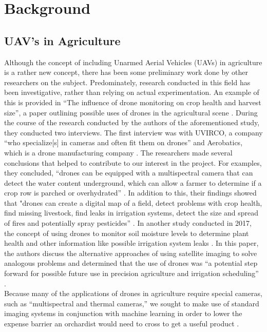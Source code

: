 \section{Background}
\subsection{UAV's in Agriculture}
Although the concept of including Unarmed Aerial Vehicles (UAVs) in agriculture is a rather new concept, there has been some preliminary work done by other researchers on the subject.
Predominately, research conducted in this field has been investigative, rather than relying on actual experimentation.
An example of this is provided in ``The influence of drone monitoring on crop health and harvest size'', a paper outlining possible uses of drones in the agricultural scene \cite{Reinecke2017}.
During the course of the research conducted by the authors of the aforementioned study, they conducted two interviews. 
The first interview was with UVIRCO, a company ``who specialize[s] in cameras and often fit them on drones'' and Aerobatics, which is a drone manufacturing company \cite{Reinecke2017}.
The researchers made several conclusions that helped to contribute to our interest in the project.
For examples, they concluded, ``drones can be equipped with a multispectral camera that can detect the water content underground, which can allow a farmer to determine if a crop row is parched or overhydrated'' \cite{Reinecke2017}.
In addition to this, their findings showed that "drones can create a digital map of a field, detect problems with crop health, find missing livestock, find leaks in irrigation systems, detect the size and spread of fires and potentially spray pesticides'' \cite{Reinecke2017}.
In another study conducted in 2017, the concept of using drones to monitor soil moisture levels to determine plant health and other information like possible irrigation system leaks \cite{Hassan2017}. In this paper, the authors discuss the alternative approaches of using satellite imaging to solve analogous problems and determined that the use of drones was ``a potential step forward for possible future use in precision agriculture and irrigation scheduling'' \cite{Hassan2017}.
\\
Because many of the applications of drones in agriculture require special cameras, such as ``multispectral and thermal cameras,'' we sought to make use of standard imaging systems in conjunction with machine learning in order to lower the expense barrier an orchardist would need to cross to get a useful product \cite{Reinecke2017}.